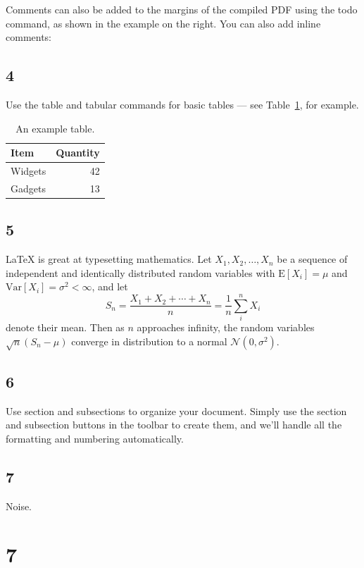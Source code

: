 \documentclass[a4paper]{article}
\begin{document}
Comments can also be added to the margins of the compiled PDF using the todo command, as shown in the example on the right. You can also add inline comments:


\subsection{4}

Use the table and tabular commands for basic tables --- see Table~\ref{tab:widgets}, for example. 

\begin{table}
\centering
\begin{tabular}{l|r}
Item & Quantity \\\hline
Widgets & 42 \\
Gadgets & 13
\end{tabular}
\caption{\label{tab:widgets}An example table.}
\end{table}

\subsection{5}

\LaTeX{} is great at typesetting mathematics. Let $X_1, X_2, \ldots, X_n$ be a sequence of independent and identically distributed random variables with $\text{E}[X_i] = \mu$ and $\text{Var}[X_i] = \sigma^2 < \infty$, and let
\[S_n = \frac{X_1 + X_2 + \cdots + X_n}{n}
      = \frac{1}{n}\sum_{i}^{n} X_i\]
denote their mean. Then as $n$ approaches infinity, the random variables $\sqrt{n}(S_n - \mu)$ converge in distribution to a normal $\mathcal{N}(0, \sigma^2)$.

\subsection{6}

Use section and subsections to organize your document. Simply use the section and subsection buttons in the toolbar to create them, and we'll handle all the formatting and numbering automatically.

\subsection{7}

Noise.

\section{7}
\end{document}
